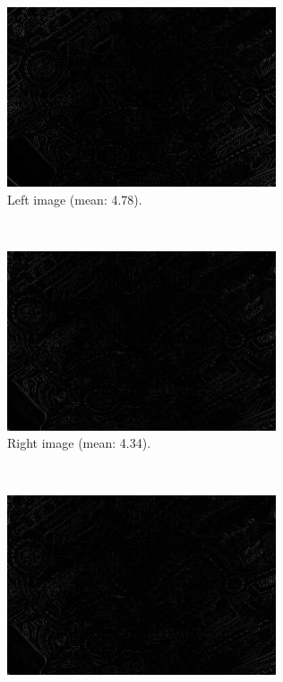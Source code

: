 \begin{figure}[h]
  \centering
  \begin{subfigure}[b]{0.7\textwidth}
    \includegraphics[width=\textwidth]{figures/rect_r1.jpg} 
    \caption{Left image (mean: 4.78).} 
    \label{fig:rect_r1}
  \end{subfigure}
  \\
  \begin{subfigure}[b]{0.7\textwidth}
    \includegraphics[width=\textwidth]{figures/rect_r2.jpg} 
    \caption{Right image (mean: 4.34).}
    \label{fig:rect_r2}
  \end{subfigure}
  \\
  \begin{subfigure}[b]{0.7\textwidth}
    \includegraphics[width=\textwidth]{figures/rect_r2_transform.jpg} 

\end{subfigure}
\end{figure}
